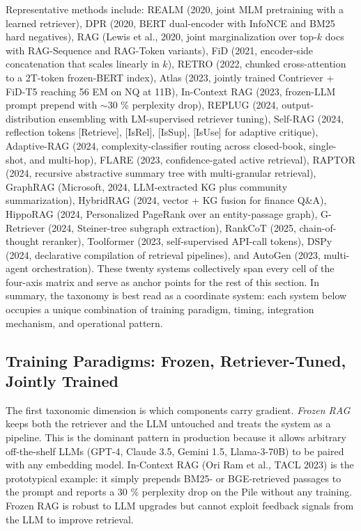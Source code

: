 \documentclass{article}
\begin{document}
Representative methods include: REALM (2020, joint MLM pretraining with a learned retriever), DPR (2020, BERT dual-encoder with InfoNCE and BM25 hard negatives), RAG (Lewis et al., 2020, joint marginalization over top-\(k\) docs with RAG-Sequence and RAG-Token variants), FiD (2021, encoder-side concatenation that scales linearly in \(k\)), RETRO (2022, chunked cross-attention to a 2T-token frozen-BERT index), Atlas (2023, jointly trained Contriever + FiD-T5 reaching 56 EM on NQ at 11B), In-Context RAG (2023, frozen-LLM prompt prepend with $\sim$30 \% perplexity drop), REPLUG (2024, output-distribution ensembling with LM-supervised retriever tuning), Self-RAG (2024, reflection tokens {[}Retrieve{]}, {[}IsRel{]}, {[}IsSup{]}, {[}IsUse{]} for adaptive critique), Adaptive-RAG (2024, complexity-classifier routing across closed-book, single-shot, and multi-hop), FLARE (2023, confidence-gated active retrieval), RAPTOR (2024, recursive abstractive summary tree with multi-granular retrieval), GraphRAG (Microsoft, 2024, LLM-extracted KG plus community summarization), HybridRAG (2024, vector + KG fusion for finance Q\&A), HippoRAG (2024, Personalized PageRank over an entity-passage graph), G-Retriever (2024, Steiner-tree subgraph extraction), RankCoT (2025, chain-of-thought reranker), Toolformer (2023, self-supervised API-call tokens), DSPy (2024, declarative compilation of retrieval pipelines), and AutoGen (2023, multi-agent orchestration). These twenty systems collectively span every cell of the four-axis matrix and serve as anchor points for the rest of this section. In summary, the taxonomy is best read as a coordinate system: each system below occupies a unique combination of training paradigm, timing, integration mechanism, and operational pattern.

\subsection{Training Paradigms: Frozen, Retriever-Tuned, Jointly Trained}\label{training-paradigms-frozen-retriever-tuned-jointly-trained}

The first taxonomic dimension is which components carry gradient. \emph{Frozen RAG} keeps both the retriever and the LLM untouched and treats the system as a pipeline. This is the dominant pattern in production because it allows arbitrary off-the-shelf LLMs (GPT-4, Claude 3.5, Gemini 1.5, Llama-3-70B) to be paired with any embedding model. In-Context RAG (Ori Ram et al., TACL 2023) is the prototypical example: it simply prepends BM25- or BGE-retrieved passages to the prompt and reports a 30 \% perplexity drop on the Pile without any training. Frozen RAG is robust to LLM upgrades but cannot exploit feedback signals from the LLM to improve retrieval.
\end{document}
